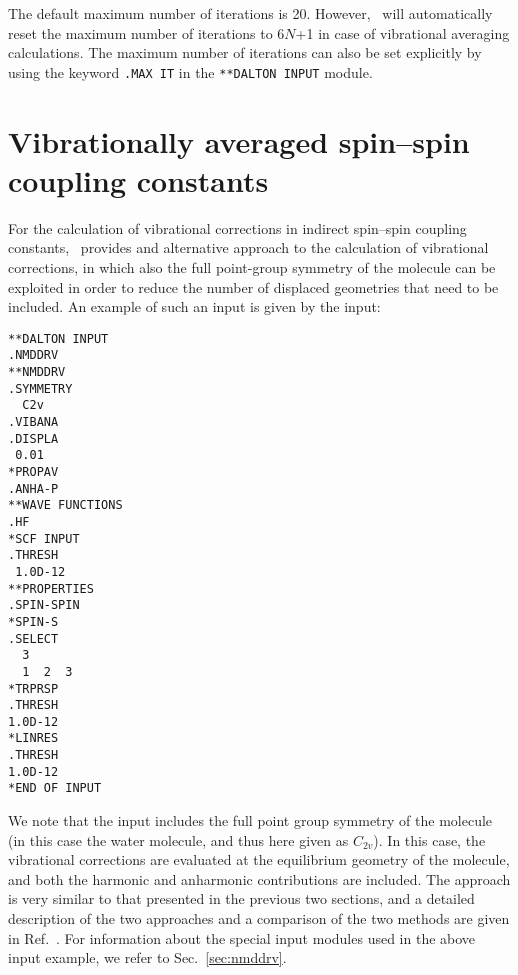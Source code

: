 The default maximum number of iterations is 20. However, \dalton\ will
automatically reset the maximum number of iterations to 6$N$+1 in case
of vibrational averaging calculations. The maximum number of
iterations can also be set explicitly by using
the keyword \verb|.MAX IT| in the \verb|**DALTON INPUT| module.

\section{Vibrationally averaged spin--spin coupling constants}

For the calculation of vibrational corrections in indirect spin--spin
coupling constants, \dalton\ provides and alternative approach to the
calculation of vibrational corrections, in which also the full
point-group symmetry of the molecule can be exploited in order to
reduce the number of displaced geometries that need to be included. An
example of such an input is given by the input:

\begin{verbatim}
**DALTON INPUT
.NMDDRV
**NMDDRV
.SYMMETRY
  C2v
.VIBANA
.DISPLA
 0.01
*PROPAV
.ANHA-P
**WAVE FUNCTIONS
.HF
*SCF INPUT
.THRESH
 1.0D-12
**PROPERTIES
.SPIN-SPIN
*SPIN-S
.SELECT
  3
  1  2  3
*TRPRSP
.THRESH
1.0D-12
*LINRES
.THRESH
1.0D-12
*END OF INPUT
\end{verbatim}

We note that the input includes the full point group symmetry of the
molecule (in this case the water molecule, and thus here given as
$C_{2v}$). In this case, the vibrational corrections are evaluated at
the equilibrium geometry of the molecule, and both the harmonic and
anharmonic contributions are included. The approach is very similar to
that presented in the previous two sections, and a detailed
description of the two approaches and a comparison of the two methods
are given in Ref.~\cite{}. For information about the special input
modules used in the above input example, we refer to
Sec.~\ref{sec:nmddrv}. 
